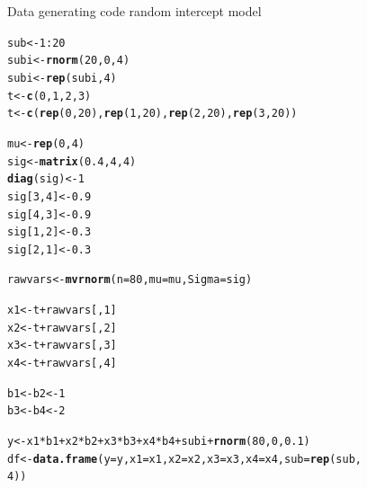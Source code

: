 \documentclass[11pt,a4paper,twoside]{book}\usepackage[]{graphicx}\usepackage[]{color}
\makeatletter
\newcommand{\hlnum}[1]{\textcolor[rgb]{0.686,0.059,0.569}{#1}}%
\newcommand{\hlopt}[1]{\textcolor[rgb]{0,0,0}{#1}}%
\newcommand{\hlstd}[1]{\textcolor[rgb]{0.345,0.345,0.345}{#1}}%
\newcommand{\hlkwb}[1]{\textcolor[rgb]{0.69,0.353,0.396}{#1}}%
\newcommand{\hlkwc}[1]{\textcolor[rgb]{0.333,0.667,0.333}{#1}}%
\newcommand{\hlkwd}[1]{\textcolor[rgb]{0.737,0.353,0.396}{\textbf{#1}}}%
\newenvironment{kframe}{%
 \def\at@end@of@kframe{}%
 \ifinner\ifhmode%
  \def\at@end@of@kframe{\end{minipage}}%
  \begin{minipage}{\columnwidth}%
 \fi\fi%
 \def\FrameCommand##1{\hskip\@totalleftmargin \hskip-\fboxsep
 \colorbox{shadecolor}{##1}\hskip-\fboxsep
     \hskip-\linewidth \hskip-\@totalleftmargin \hskip\columnwidth}%
 \MakeFramed {\advance\hsize-\width
   \@totalleftmargin\z@ \linewidth\hsize
   \@setminipage}}%
 {\par\unskip\endMakeFramed%
 \at@end@of@kframe}
\newenvironment{knitrout}{}{} %
\makeatother
\begin{document}
\begin{codeenv}

\caption{Data generating code random intercept model}\label{r04:simdatri}
\begin{knitrout}
\color{fgcolor}\begin{kframe}
\begin{alltt}
\hlstd{sub} \hlkwb{<-} \hlnum{1}\hlopt{:}\hlnum{20}
\hlstd{subi} \hlkwb{<-} \hlkwd{rnorm}\hlstd{(}\hlnum{20}\hlstd{,} \hlnum{0}\hlstd{,} \hlnum{4}\hlstd{)}
\hlstd{subi} \hlkwb{<-} \hlkwd{rep}\hlstd{(subi,} \hlnum{4}\hlstd{)}
\hlstd{t} \hlkwb{<-} \hlkwd{c}\hlstd{(}\hlnum{0}\hlstd{,} \hlnum{1}\hlstd{,} \hlnum{2}\hlstd{,} \hlnum{3}\hlstd{)}
\hlstd{t} \hlkwb{<-} \hlkwd{c}\hlstd{(}\hlkwd{rep}\hlstd{(}\hlnum{0}\hlstd{,} \hlnum{20}\hlstd{),} \hlkwd{rep}\hlstd{(}\hlnum{1}\hlstd{,} \hlnum{20}\hlstd{),} \hlkwd{rep}\hlstd{(}\hlnum{2}\hlstd{,} \hlnum{20}\hlstd{),} \hlkwd{rep}\hlstd{(}\hlnum{3}\hlstd{,} \hlnum{20}\hlstd{))}

\hlstd{mu} \hlkwb{<-} \hlkwd{rep}\hlstd{(}\hlnum{0}\hlstd{,} \hlnum{4}\hlstd{)}
\hlstd{sig} \hlkwb{<-} \hlkwd{matrix}\hlstd{(}\hlnum{0.4}\hlstd{,} \hlnum{4}\hlstd{,} \hlnum{4}\hlstd{)}
\hlkwd{diag}\hlstd{(sig)} \hlkwb{<-} \hlnum{1}
\hlstd{sig[}\hlnum{3}\hlstd{,} \hlnum{4}\hlstd{]} \hlkwb{<-} \hlnum{0.9}
\hlstd{sig[}\hlnum{4}\hlstd{,} \hlnum{3}\hlstd{]} \hlkwb{<-} \hlnum{0.9}
\hlstd{sig[}\hlnum{1}\hlstd{,} \hlnum{2}\hlstd{]} \hlkwb{<-} \hlnum{0.3}
\hlstd{sig[}\hlnum{2}\hlstd{,} \hlnum{1}\hlstd{]} \hlkwb{<-} \hlnum{0.3}

\hlstd{rawvars} \hlkwb{<-} \hlkwd{mvrnorm}\hlstd{(}\hlkwc{n} \hlstd{=} \hlnum{80}\hlstd{,} \hlkwc{mu} \hlstd{= mu,} \hlkwc{Sigma} \hlstd{= sig)}

\hlstd{x1} \hlkwb{<-} \hlstd{t} \hlopt{+} \hlstd{rawvars[,} \hlnum{1}\hlstd{]}
\hlstd{x2} \hlkwb{<-} \hlstd{t} \hlopt{+} \hlstd{rawvars[,} \hlnum{2}\hlstd{]}
\hlstd{x3} \hlkwb{<-} \hlstd{t} \hlopt{+} \hlstd{rawvars[,} \hlnum{3}\hlstd{]}
\hlstd{x4} \hlkwb{<-} \hlstd{t} \hlopt{+} \hlstd{rawvars[,} \hlnum{4}\hlstd{]}

\hlstd{b1} \hlkwb{<-} \hlstd{b2} \hlkwb{<-} \hlnum{1}
\hlstd{b3} \hlkwb{<-} \hlstd{b4} \hlkwb{<-} \hlnum{2}

\hlstd{y} \hlkwb{<-} \hlstd{x1} \hlopt{*} \hlstd{b1} \hlopt{+} \hlstd{x2} \hlopt{*} \hlstd{b2} \hlopt{+} \hlstd{x3} \hlopt{*} \hlstd{b3} \hlopt{+} \hlstd{x4} \hlopt{*} \hlstd{b4} \hlopt{+} \hlstd{subi} \hlopt{+} \hlkwd{rnorm}\hlstd{(}\hlnum{80}\hlstd{,} \hlnum{0}\hlstd{,} \hlnum{0.1}\hlstd{)}
\hlstd{df} \hlkwb{<-} \hlkwd{data.frame}\hlstd{(}\hlkwc{y} \hlstd{= y,} \hlkwc{x1} \hlstd{= x1,} \hlkwc{x2} \hlstd{= x2,} \hlkwc{x3} \hlstd{= x3,} \hlkwc{x4} \hlstd{= x4,} \hlkwc{sub} \hlstd{=} \hlkwd{rep}\hlstd{(sub,}
    \hlnum{4}\hlstd{))}
\end{alltt}
\end{kframe}
\end{knitrout}

	\end{codeenv}
	
\end{document}
